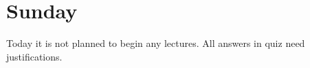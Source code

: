 

\section{Sunday}
Today it is not planned to begin any lectures. All answers in quiz need justifications.